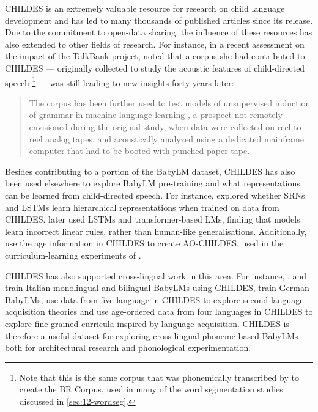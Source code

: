 CHILDES is an extremely valuable resource for research on child language development and has led to many thousands of published articles since its release. Due to the commitment to open-data sharing, the influence of these resources has also extended to other fields of research. For instance, in a recent assessment on the impact of the TalkBank project, \citet{bernstein_ratner_augmenting_2024} noted that a corpus she had contributed to CHILDES --- originally collected to study the acoustic features of child-directed speech \citep{Ratner_1984}\footnote{Note that this is the same corpus that was phonemically transcribed by \citet{Brent1999} to create the BR Corpus, used in many of the word segmentation studies discussed in \cref{sec:12-wordseg}.} --- was still leading to new insights forty years later:
\begin{quote}
The corpus has been further used to test models of unsupervised induction of grammar in machine language learning \citep{glushchenko_programmatic_2019}, a prospect not remotely envisioned during the original study, when data were collected on reel-to-reel analog tapes, and acoustically analyzed using a dedicated mainframe computer that had to be booted with punched paper tape.
\end{quote}

Besides contributing to a portion of the BabyLM dataset, CHILDES has also been used elsewhere to explore BabyLM pre-training and what representations can be learned from child-directed speech. For instance, \citet{huebner_structured_2018} explored whether SRNs and LSTMs learn hierarchical representations when trained on data from CHILDES. \citet{yedetore-etal-2023-poor} later used LSTMs and transformer-based LMs, finding that models learn incorrect linear rules, rather than human-like generalisations. Additionally, \citet{huebner2021using} use the age information in CHILDES to create AO-CHILDES, used in the curriculum-learning experiments of \citet{huebner-etal-2021-babyberta}.

CHILDES has also supported cross-lingual work in this area. For instance, \citet{capone2024babies},\citet{shen2024bambino} and \citet{suozzi2025bambidevelopingbabylanguage} train Italian monolingual and bilingual BabyLMs using CHILDES, \citet{bunzeck2025constructiondistributionsshapeformal} train German BabyLMs, \citet{yadavalli2023slabert} use data from five language in CHILDES to explore second language acquisition theories and \citet{salhan-etal-2024-less} use age-ordered data from four languages in CHILDES to explore fine-grained curricula inspired by language acquisition. CHILDES is therefore a useful dataset for exploring cross-lingual phoneme-based BabyLMs both for architectural research and phonological experimentation.  

